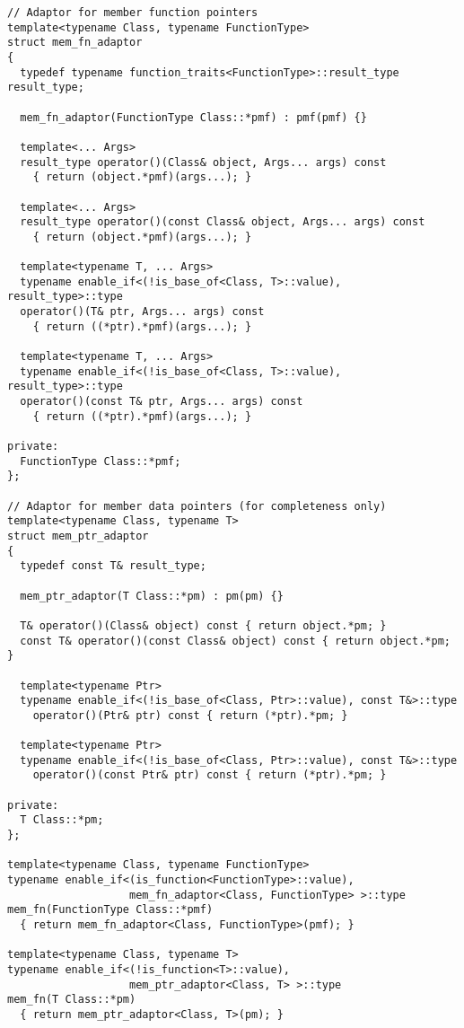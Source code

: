 \documentclass{article}
\begin{document}
\small
\begin{verbatim}
// Adaptor for member function pointers
template<typename Class, typename FunctionType>
struct mem_fn_adaptor
{
  typedef typename function_traits<FunctionType>::result_type result_type;

  mem_fn_adaptor(FunctionType Class::*pmf) : pmf(pmf) {}
  
  template<... Args>
  result_type operator()(Class& object, Args... args) const
    { return (object.*pmf)(args...); }

  template<... Args>
  result_type operator()(const Class& object, Args... args) const
    { return (object.*pmf)(args...); }

  template<typename T, ... Args>
  typename enable_if<(!is_base_of<Class, T>::value), result_type>::type
  operator()(T& ptr, Args... args) const
    { return ((*ptr).*pmf)(args...); }

  template<typename T, ... Args>
  typename enable_if<(!is_base_of<Class, T>::value), result_type>::type
  operator()(const T& ptr, Args... args) const
    { return ((*ptr).*pmf)(args...); }

private:
  FunctionType Class::*pmf;
};

// Adaptor for member data pointers (for completeness only)
template<typename Class, typename T>
struct mem_ptr_adaptor
{
  typedef const T& result_type;

  mem_ptr_adaptor(T Class::*pm) : pm(pm) {}

  T& operator()(Class& object) const { return object.*pm; }
  const T& operator()(const Class& object) const { return object.*pm; }

  template<typename Ptr> 
  typename enable_if<(!is_base_of<Class, Ptr>::value), const T&>::type
    operator()(Ptr& ptr) const { return (*ptr).*pm; }

  template<typename Ptr> 
  typename enable_if<(!is_base_of<Class, Ptr>::value), const T&>::type
    operator()(const Ptr& ptr) const { return (*ptr).*pm; }

private:
  T Class::*pm;
};

template<typename Class, typename FunctionType>
typename enable_if<(is_function<FunctionType>::value), 
                   mem_fn_adaptor<Class, FunctionType> >::type
mem_fn(FunctionType Class::*pmf)
  { return mem_fn_adaptor<Class, FunctionType>(pmf); }

template<typename Class, typename T>
typename enable_if<(!is_function<T>::value), 
                   mem_ptr_adaptor<Class, T> >::type
mem_fn(T Class::*pm)
  { return mem_ptr_adaptor<Class, T>(pm); }
\end{verbatim}
\normalsize 
\end{document}
